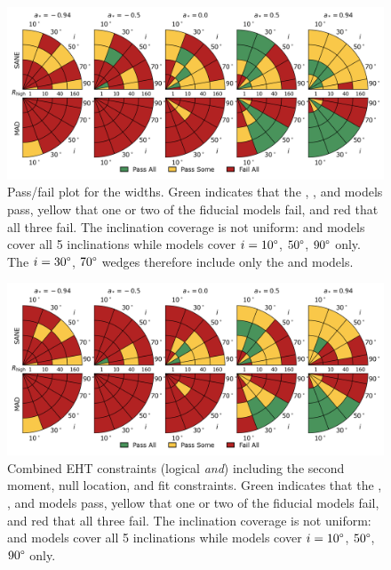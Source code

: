 \label{sec:mring}

\begin{figure}
 \centering
 \includegraphics[width=\textwidth]{./figures/Mring_w_Constraints.png}
  \caption{Pass/fail plot for the \mring widths.
    Green indicates that the \kharma, \bhac, and \hamr models pass, yellow that one or two of the fiducial models fail, and red that all three fail.
    The inclination coverage is not uniform: \bhac and \kharma models cover all 5 inclinations while \hamr models cover $i = 10\degree$, $50\degree$, $90\degree$ only.
    The $i = 30\degree$, $70\degree$ wedges therefore include only the \bhac and \kharma models.}
  \label{fig:mring_width_salsa} %
\end{figure}

\begin{figure}
  \centering
  \includegraphics[width=\textwidth]{./figures/Interferometric_Constraints.png}
  \caption{Combined EHT constraints (logical {\em and}) including the second moment, null location, and \mring fit constraints.
    Green indicates that the \kharma, \bhac, and \hamr models pass, yellow that one or two of the fiducial models fail, and red that all three fail.
    The inclination coverage is not uniform: \bhac and \kharma models cover all 5 inclinations while \hamr models cover $i = 10\degree$, $50\degree$, $90\degree$ only.}
  \label{fig:all_EHT_constraints} %
\end{figure}

